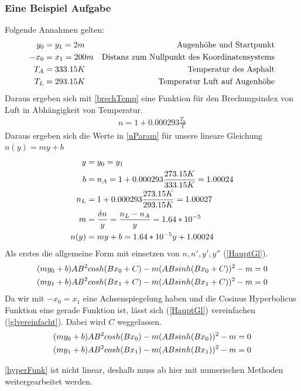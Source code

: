 \subsubsection{Eine Beispiel Aufgabe}
Folgende Annahmen gelten:
\begin{align}
	y_0&=y_1=2 m & \text{Augenhöhe und Startpunkt} \notag \\
	-x_0&=x_1 = 200m & \text{Distanz zum Nullpunkt des Koordinatensystems} \notag \\
	T_A&=333.15 K & \text{Temperatur des Asphalt}  \notag \\
	T_L&=293.15 K & \text{Temperatur Luft auf Augenhöhe}  \notag
\end{align}
Daraus ergeben sich mit \eqref{brechTemp} eine Funktion für den Brechungsindex von Luft in Abhängigkeit von Temperatur.
\begin{align}
	n=1+0.000293\frac{T_0}{T}
	\label{brechTemp}
\end{align}
Daraus ergeben sich die Werte in \eqref{nParam} für unsere lineare Gleichung $n(y)=my+b$
\begin{align}
	y&=y_0=y_1 \notag \\
	b&=n_A=1+0.000293\frac{273.15 K}{333.15 K} = 1.00024 \notag \\
	n_L&=1+0.000293\frac{273.15 K}{293.15 K} = 1.00027 \notag \\
	m&=\frac{\delta n}{y}=\frac{n_L-n_A}{y}=1.64*10^{-5} \notag \\
	n(y)&=my+b=1.64*10^{-5}y +1.00024
	\label{nParam}
\end{align}
Als erstes die allgemeine Form mit einsetzen von $n,n',y',y''$ (\eqref{HauptGl}).
\begin{align}
	(my_0+b)A B^2 cosh(B x_0 + C)-m (A B sinh(B x_0 + C))^2-m &= 0\notag \\
	(my_1+b)A B^2 cosh(B x_1 + C)-m (A B sinh(B x_1 + C))^2-m &=0 \label{HauptGl}
\end{align}
Da wir mit $-x_0=x_1$ eine Achsenspiegelung haben und die Cosinus Hyperbolicus Funktion eine gerade Funktion ist, lässt sich (\eqref{HauptGl}) vereinfachen (\eqref{glvereinfacht}). Dabei wird $C$ weggelassen.
\begin{align}
	(my_0+b)A B^2 cosh(B x_0 )-m (A B sinh(B x_0 ))^2-m &= 0\notag \\
	(my_1+b)A B^2 cosh(B x_1 )-m (A B sinh(B x_1 ))^2-m &=0 \label{glvereinfacht}
\end{align}

 \eqref{hyperFunk}  ist nicht linear, deshalb muss ab hier mit numerischen Methoden weitergearbeitet werden.
 
